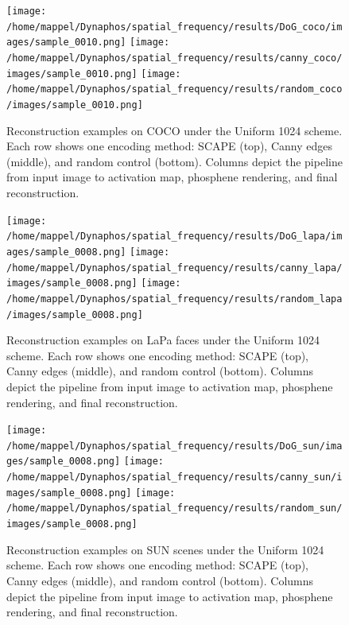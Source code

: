 \begin{figure}[h]
  \centering
  \texttt{[image: /home/mappel/Dynaphos/spatial\_frequency/results/DoG\_coco/images/sample\_0010.png]}
  \texttt{[image: /home/mappel/Dynaphos/spatial\_frequency/results/canny\_coco/images/sample\_0010.png]}
  \texttt{[image: /home/mappel/Dynaphos/spatial\_frequency/results/random\_coco/images/sample\_0010.png]}
  \caption{Reconstruction examples on COCO under the Uniform 1024 scheme. Each row shows one encoding method: SCAPE (top), Canny edges (middle), and random control (bottom). Columns depict the pipeline from input image to activation map, phosphene rendering, and final reconstruction.}
  \label{fig:recon_examples_coco}
\end{figure}

\begin{figure}[h]
  \centering
  \texttt{[image: /home/mappel/Dynaphos/spatial\_frequency/results/DoG\_lapa/images/sample\_0008.png]}
  \texttt{[image: /home/mappel/Dynaphos/spatial\_frequency/results/canny\_lapa/images/sample\_0008.png]}
  \texttt{[image: /home/mappel/Dynaphos/spatial\_frequency/results/random\_lapa/images/sample\_0008.png]}
  \caption{Reconstruction examples on LaPa faces under the Uniform 1024 scheme. Each row shows one encoding method: SCAPE (top), Canny edges (middle), and random control (bottom). Columns depict the pipeline from input image to activation map, phosphene rendering, and final reconstruction.}
  \label{fig:recon_examples_lapa}
\end{figure}

\begin{figure}[h]
  \centering
  \texttt{[image: /home/mappel/Dynaphos/spatial\_frequency/results/DoG\_sun/images/sample\_0008.png]}
  \texttt{[image: /home/mappel/Dynaphos/spatial\_frequency/results/canny\_sun/images/sample\_0008.png]}
  \texttt{[image: /home/mappel/Dynaphos/spatial\_frequency/results/random\_sun/images/sample\_0008.png]}
  \caption{Reconstruction examples on SUN scenes under the Uniform 1024 scheme. Each row shows one encoding method: SCAPE (top), Canny edges (middle), and random control (bottom). Columns depict the pipeline from input image to activation map, phosphene rendering, and final reconstruction.}
  \label{fig:recon_examples_sun}
\end{figure}




